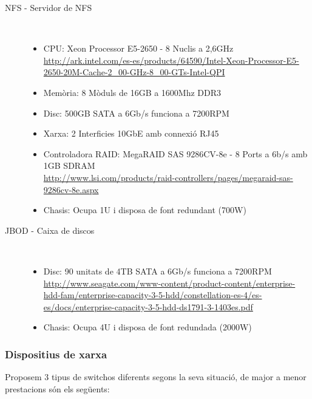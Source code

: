 \begin{description}
    \item[NFS - Servidor de NFS] \hfill \\
        \vspace{-5mm}
        \begin{itemize}[leftmargin=*]
            \item CPU: Xeon Processor E5-2650 - 8 Nuclis a 2,6GHz 
            \\\url{http://ark.intel.com/es-es/products/64590/Intel-Xeon-Processor-E5-2650-20M-Cache-2\_00-GHz-8\_00-GTs-Intel-QPI}
            \item Memòria: 8 Mòduls de 16GB a 1600Mhz DDR3
            \item Disc: 500GB SATA a 6Gb/s funciona a 7200RPM
            \item Xarxa: 2 Interficies 10GbE amb connexió RJ45
            \item Controladora RAID: MegaRAID SAS 9286CV-8e - 8 Ports a 6b/s amb  1GB SDRAM
            \\\url{http://www.lsi.com/products/raid-controllers/pages/megaraid-sas-9286cv-8e.aspx}
            \item Chasis: Ocupa 1U i disposa de font redundant (700W)
        \end{itemize}
        
    \item[JBOD - Caixa de discos] \hfill \\
        \vspace{-5mm}
        \begin{itemize}[leftmargin=*]
            \item Disc: 90 unitats de 4TB SATA a 6Gb/s funciona a 7200RPM
            \\\url{http://www.seagate.com/www-content/product-content/enterprise-hdd-fam/enterprise-capacity-3-5-hdd/constellation-es-4/es-es/docs/enterprise-capacity-3-5-hdd-ds1791-3-1403es.pdf}
            \item Chasis: Ocupa 4U i disposa de font redundada (2000W)
        \end{itemize}
    
    
\end{description}

\subsubsection{Dispositius de xarxa}

Proposem 3 tipus de switchos diferents segons la seva situació, de major a menor prestacions són els següents:

